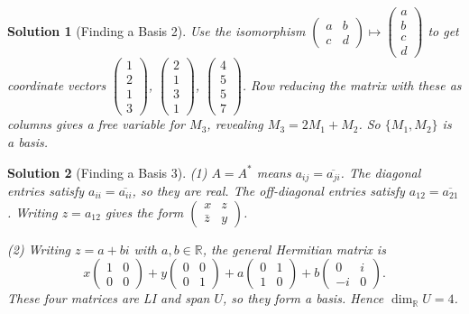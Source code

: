 \documentclass{article}
\newtheorem{solution}{Solution}
\begin{document}
\begin{solution}[Finding a Basis 2]
    Use the isomorphism $\begin{pmatrix}a&b\\c&d\end{pmatrix}\mapsto\begin{pmatrix}a\\b\\c\\d\end{pmatrix}$ to get coordinate vectors $\begin{pmatrix}1\\2\\1\\3\end{pmatrix}$, $\begin{pmatrix}2\\1\\3\\1\end{pmatrix}$, $\begin{pmatrix}4\\5\\5\\7\end{pmatrix}$. Row reducing the matrix with these as columns gives a free variable for $M_3$, revealing $M_3 = 2M_1+M_2$. So $\{M_1, M_2\}$ is a basis.
\end{solution}
\begin{solution}[Finding a Basis 3]
    (1) $A = A^*$ means $a_{ij} = \overline{a_{ji}}$. The diagonal entries satisfy $a_{ii} = \overline{a_{ii}}$, so they are real. The off-diagonal entries satisfy $a_{12} = \overline{a_{21}}$. Writing $z = a_{12}$ gives the form $\begin{pmatrix}x&z\\\bar{z}&y\end{pmatrix}$.

    (2) Writing $z = a+bi$ with $a,b\in\mathbb{R}$, the general Hermitian matrix is
    \[x\begin{pmatrix}1&0\\0&0\end{pmatrix}+y\begin{pmatrix}0&0\\0&1\end{pmatrix}+a\begin{pmatrix}0&1\\1&0\end{pmatrix}+b\begin{pmatrix}0&i\\-i&0\end{pmatrix}.\]
    These four matrices are LI and span $U$, so they form a basis. Hence $\dim_{\mathbb{R}} U = 4$.
\end{solution}
\end{document}
